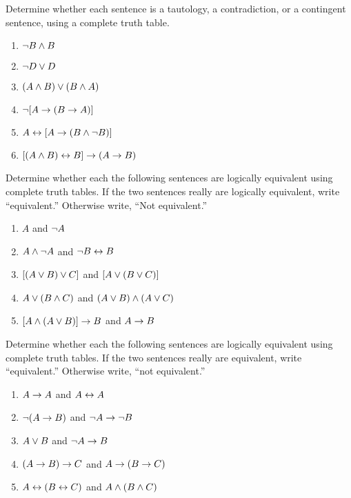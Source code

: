 \problempart Determine whether each sentence is a tautology, a contradiction, or a contingent sentence, using a complete truth table.
\begin{enumerate}
\item $\neg B \wedge B$ \vspace{.5ex}%
\item $\neg D \vee D$ \vspace{.5ex}%
\item $(A\wedge B) \vee (B\wedge A)$\vspace{.5ex} %
\item $\neg[A \rightarrow (B \rightarrow A)]$\vspace{.5ex} %
\item $A \leftrightarrow [A \rightarrow (B \wedge \neg B)]$ \vspace{.5ex}%
\item $[(A \wedge B) \leftrightarrow B] \rightarrow (A \rightarrow B)$ \vspace{.5ex}%
\end{enumerate}

\noindent\problempart
\label{pr.TT.equiv}
Determine whether each the following sentences are logically equivalent using complete truth tables. If the two sentences really are logically equivalent, write ``equivalent.'' Otherwise write, ``Not equivalent.'' 
\begin{enumerate}
\item $A$ and $\neg A$
\item $A \wedge \neg A$ and $\neg B \leftrightarrow B$
\item $[(A \vee B) \vee C]$ and $[A \vee (B \vee C)]$
\item $A \vee (B \wedge C)$ and $(A \vee B) \wedge (A \vee C)$
\item $[A \wedge (A \vee B)] \rightarrow B$ and $A \rightarrow B$
\end{enumerate}

\problempart
\label{pr.TT.equiv2}
Determine whether each the following sentences are logically equivalent using complete truth tables. If the two sentences really are equivalent, write ``equivalent.'' Otherwise write, ``not equivalent.''
\begin{enumerate}
\item $A\rightarrow A$ and $A \leftrightarrow A$
\item $\neg(A \rightarrow B)$ and $\neg A \rightarrow \neg B$
\item $A \vee B$ and $\neg A \rightarrow B$
\item$(A \rightarrow B) \rightarrow C$ and $A \rightarrow (B \rightarrow C)$
\item $A \leftrightarrow (B \leftrightarrow C)$ and $A \wedge (B \wedge C)$
\end{enumerate}

